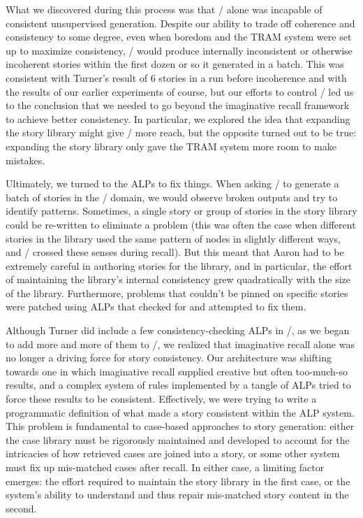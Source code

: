 What we discovered during this process was that \skald/ alone was incapable of consistent unsupervised generation.
%
Despite our ability to trade off coherence and consistency to some degree, even when boredom and the TRAM system were set up to maximize consistency, \skald/ would produce internally inconsistent or otherwise incoherent stories within the first dozen or so it generated in a batch.
%
This was consistent with Turner's result of 6 stories in a run before incoherence and with the results of our earlier experiments of course, but our efforts to control \skald/ led us to the conclusion that we needed to go beyond the imaginative recall framework to achieve better consistency. 
%
In particular, we explored the idea that expanding the story library might give \skald/ more reach, but the opposite turned out to be true: expanding the story library only gave the TRAM system more room to make mistakes.


Ultimately, we turned to the ALPs to fix things.
%
When asking \skald/ to generate a batch of stories in the \problemplanets/ domain, we would observe broken outputs and try to identify patterns.
%
Sometimes, a single story or group of stories in the story library could be re-written to eliminate a problem (this was often the case when different stories in the library used the same pattern of nodes in slightly different ways, and \skald/ crossed these senses during recall).
%
But this meant that Aaron had to be extremely careful in authoring stories for the library, and in particular, the effort of maintaining the library's internal consistency grew quadratically with the size of the library.
%
Furthermore, problems that couldn't be pinned on specific stories were patched using ALPs that checked for and attempted to fix them.


Although Turner did include a few consistency-checking ALPs in \minstrel/, as we began to add more and more of them to \skald/, we realized that imaginative recall alone was no longer a driving force for story consistency.
%
Our architecture was shifting towards one in which imaginative recall supplied creative but often too-much-so results, and a complex system of rules implemented by a tangle of ALPs tried to force these results to be consistent.
%
Effectively, we were trying to write a programmatic definition of what made a story consistent within the ALP system.
%
This problem is fundamental to case-based approaches to story generation: either the case library must be rigorously maintained and developed to account for the intricacies of how retrieved cases are joined into a story, or some other system must fix up mis-matched cases after recall.
%
In either case, a limiting factor emerges: the effort required to maintain the story library in the first case, or the system's ability to understand and thus repair mis-matched story content in the second.


